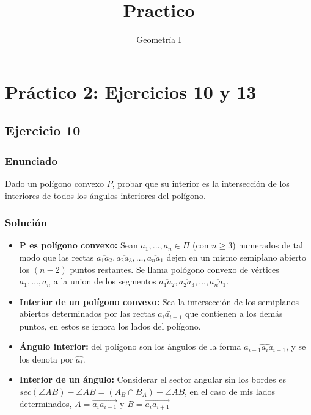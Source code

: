 \documentclass[a4paper]{article}
\title{Practico}
\author{Geometría I}
\begin{document}
\maketitle
\section{Práctico 2: Ejercicios 10 y 13}
\subsection{Ejercicio 10}
\subsubsection{Enunciado}
Dado un polígono convexo $P$, probar que su interior es la intersección de los interiores de todos los ángulos interiores del polígono.
\subsubsection{Solución}
\begin{itemize}
\item \textbf{P es polígono convexo:} Sean $a_1,\dots, a_n \in \Pi$ (con $n\geq 3$) numerados de tal modo que las rectas $\overline{a_1a_2}, \overline{a_2a_3}, \dots, \overline{a_na_1}$ dejen en un mismo semiplano abierto los $(n-2)$ puntos restantes. Se llama pológono convexo de vértices $a_1,\dots,a_n$ a la union de los segmentos $\overline{a_1a_2}, \overline{a_2a_3}, \dots, \overline{a_na_1}$.
\item \textbf{Interior de un polígono convexo:} Sea la intersección de los semiplanos abiertos determinados por las rectas $\overleftrightarrow{a_ia_{i+1}}$ que contienen a los demás puntos, en estos se ignora los lados del polígono.
\item \textbf{Ángulo interior:} del polígono son los ángulos de la forma $\widehat{a_{i-1}a_ia_{i+1}}$, y se los denota por $\hat{a_i}$.
\item \textbf{Interior de un ángulo:} Considerar el sector angular sin los bordes es $sec(\angle AB) - \angle AB =(A_B\cap B_A)- \angle AB$, en el caso de mis lados determinados, $A=\overrightarrow{a_ia_{i-1}}$ y $B=\overrightarrow{a_{i}a_{i+1}}$
\end{itemize}
\end{document}
